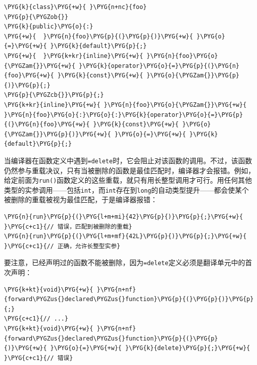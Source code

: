 \begin{codeblockbg}
\begin{Verbatim}[commandchars=\\\{\},breaklines=true,breakanywhere=true,fontsize=\codefont,xleftmargin=17bp]
\PYG{k}{class}\PYG{+w}{ }\PYG{n+nc}{foo}
\PYG{p}{\PYGZob{}}
\PYG{k}{public}\PYG{o}{:}
\PYG{+w}{  }\PYG{n}{foo}\PYG{p}{(}\PYG{p}{)}\PYG{+w}{ }\PYG{o}{=}\PYG{+w}{ }\PYG{k}{default}\PYG{p}{;}
\PYG{+w}{  }\PYG{k+kr}{inline}\PYG{+w}{ }\PYG{n}{foo}\PYG{o}{\PYGZam{}}\PYG{+w}{ }\PYG{k}{operator}\PYG{o}{=}\PYG{p}{(}\PYG{n}{foo}\PYG{+w}{ }\PYG{k}{const}\PYG{+w}{ }\PYG{o}{\PYGZam{}}\PYG{p}{)}\PYG{p}{;}
\PYG{p}{\PYGZcb{}}\PYG{p}{;}
\PYG{k+kr}{inline}\PYG{+w}{ }\PYG{n}{foo}\PYG{o}{\PYGZam{}}\PYG{+w}{ }\PYG{n}{foo}\PYG{o}{:}\PYG{o}{:}\PYG{k}{operator}\PYG{o}{=}\PYG{p}{(}\PYG{n}{foo}\PYG{+w}{ }\PYG{k}{const}\PYG{+w}{ }\PYG{o}{\PYGZam{}}\PYG{p}{)}\PYG{+w}{ }\PYG{o}{=}\PYG{+w}{ }\PYG{k}{default}\PYG{p}{;}
\end{Verbatim}
\end{codeblockbg}



当编译器在函数定义中遇到\texttt{=delete}时，它会阻止对该函数的调用。不过，该函数仍然参与重载决议，只有当被删除的函数是最佳匹配时，编译器才会报错。例如，给定前面为\texttt{run()}函数定义的这些重载，就只有用长整型调用才可行。用任何其他类型的实参调用——包括\texttt{int}，而\texttt{int}存在到\texttt{long}的自动类型提升——都会使某个被删除的重载被视为最佳匹配，于是编译器报错：



\begin{codeblockbg}
\begin{Verbatim}[commandchars=\\\{\},breaklines=true,breakanywhere=true,fontsize=\codefont,xleftmargin=17bp]
\PYG{n}{run}\PYG{p}{(}\PYG{l+m+mi}{42}\PYG{p}{)}\PYG{p}{;}\PYG{+w}{  }\PYG{c+c1}{// 错误，匹配到被删除的重载}
\PYG{n}{run}\PYG{p}{(}\PYG{l+m+mf}{42L}\PYG{p}{)}\PYG{p}{;}\PYG{+w}{ }\PYG{c+c1}{// 正确，允许长整型实参}
\end{Verbatim}
\end{codeblockbg}



要注意，已经声明过的函数不能被删除，因为\texttt{=delete}定义必须是翻译单元中的首次声明：



\begin{codeblockbg}
\begin{Verbatim}[commandchars=\\\{\},breaklines=true,breakanywhere=true,fontsize=\codefont,xleftmargin=17bp]
\PYG{k+kt}{void}\PYG{+w}{ }\PYG{n+nf}{forward\PYGZus{}declared\PYGZus{}function}\PYG{p}{(}\PYG{p}{)}\PYG{p}{;}
\PYG{c+c1}{// ...}
\PYG{k+kt}{void}\PYG{+w}{ }\PYG{n+nf}{forward\PYGZus{}declared\PYGZus{}function}\PYG{p}{(}\PYG{p}{)}\PYG{+w}{ }\PYG{o}{=}\PYG{+w}{ }\PYG{k}{delete}\PYG{p}{;}\PYG{+w}{ }\PYG{c+c1}{// 错误}
\end{Verbatim}
\end{codeblockbg}


